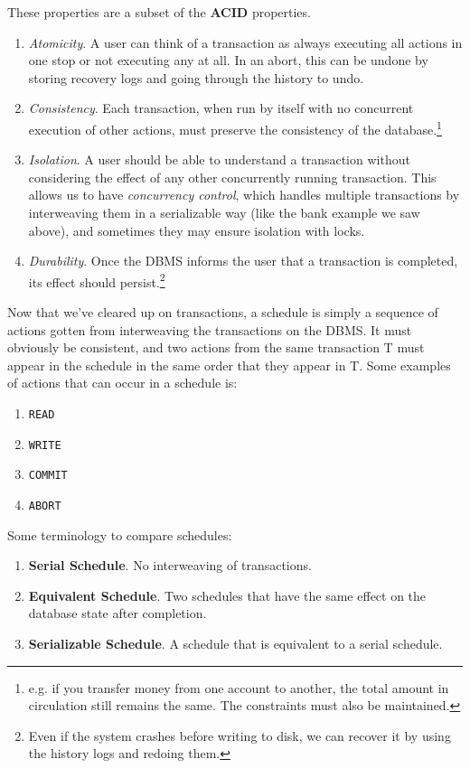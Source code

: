 \documentclass{article}
\begin{document}
    \begin{definition}[ACID]
      These properties are a subset of the \textbf{ACID} properties.
      \begin{enumerate}
        \item \textit{Atomicity}. A user can think of a transaction as always executing all actions in one stop or not executing any at all. In an abort, this can be undone by storing recovery logs and going through the history to undo. 
        \item \textit{Consistency}. Each transaction, when run by itself with no concurrent execution of other actions, must preserve the consistency of the database.\footnote{e.g. if you transfer money from one account to another, the total amount in circulation still remains the same. The constraints must also be maintained. } 
        \item \textit{Isolation}. A user should be able to understand a transaction without considering the effect of any other concurrently running transaction. This allows us to have \textit{concurrency control}, which handles multiple transactions by interweaving them in a serializable way (like the bank example we saw above), and sometimes they may ensure isolation with locks.  

        \item \textit{Durability}. Once the DBMS informs the user that a transaction is completed, its effect should persist.\footnote{Even if the system crashes before writing to disk, we can recover it by using the history logs and redoing them.}
      \end{enumerate}
    \end{definition}

    \begin{definition}[Schedule]
      Now that we've cleared up on transactions, a schedule is simply a sequence of actions gotten from interweaving the transactions on the DBMS. It must obviously be consistent, and two actions from the same transaction T must appear in the schedule in the same order that they appear in T. Some examples of actions that can occur in a schedule is: 
      \begin{enumerate}
        \item \texttt{READ} 
        \item \texttt{WRITE}
        \item \texttt{COMMIT}
        \item \texttt{ABORT} 
      \end{enumerate}
      Some terminology to compare schedules: 
      \begin{enumerate}
        \item \textbf{Serial Schedule}. No interweaving of transactions. 
        \item \textbf{Equivalent Schedule}. Two schedules that have the same effect on the database state after completion. 
        \item \textbf{Serializable Schedule}. A schedule that is equivalent to a serial schedule. 
      \end{enumerate}
    \end{definition}
\end{document}
